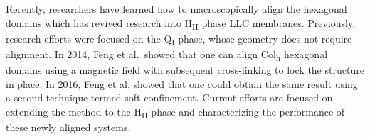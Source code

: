 \documentclass[journal=jpcbfk,manusciprt=article]{achemso}
\begin{document}

  Recently, researchers have learned how to macroscopically align the hexagonal
  domains which has revived research into H\textsubscript{II} phase LLC membranes.
  Previously, research efforts were focused on the Q\textsubscript{I} phase,
  whose geometry does not require alignment. In 2014, Feng et al.~showed that one
  can align Col\textsubscript{h} hexagonal domains using a magnetic field with
  subsequent cross-linking to lock the structure in place\cite{feng_scalable_2014}.
  In 2016, Feng et al. showed that one could obtain the same result using a second
  technique termed soft confinement\cite{feng_thin_2016}. Current efforts are focused
  on extending the method to the H\textsubscript{II} phase and characterizing the 
  performance of these newly aligned systems.

\end{document}
